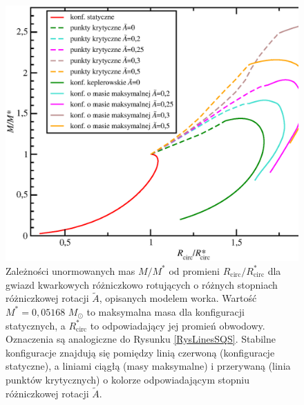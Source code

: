 \documentclass{bachelor_thesis}
\begin{document}
            \begin{figure}[h!]
            \centering
            \includegraphics[scale=.43]{figures/RysMofRsqs.eps}
            \caption{Zależności unormowanych mas $M/M^*$ od promieni $R_\textrm{circ}/R^*_\textrm{circ}$ dla gwiazd kwarkowych różniczkowo rotujących o różnych stopniach różniczkowej rotacji $\tilde{A}$, opisanych modelem worka. Wartość $M^*=0,05168$ $M_\odot$ to maksymalna masa dla konfiguracji statycznych, a $R^*_\textrm{circ}$ to odpowiadający jej promień obwodowy. Oznaczenia są analogiczne do Rysunku \ref{RysLinesSQS}. Stabilne konfiguracje znajdują się pomiędzy linią czerwoną (konfiguracje statyczne), a liniami ciągłą (masy maksymalne) i przerywaną (linia punktów krytycznych) o kolorze odpowiadającym stopniu różniczkowej rotacji $\tilde{A}$.}
            \label{RysMofRsqs}
            \end{figure}
\end{document}
